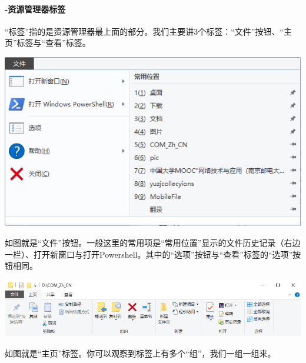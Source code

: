 \paragraph{-资源管理器标签}
“标签”指的是资源管理器最上面的部分。我们主要讲3个标签：“文件”按钮、“主页”标签与“查看”标签。
\begin{center}
	\includegraphics[scale=0.8]{pic/Exp4}
\end{center} \par
如图就是“文件”按钮。一般这里的常用项是“常用位置”显示的文件历史记录（右边一栏）、打开新窗口与打开Powershell。其中的“选项”按钮与“查看”标签的“选项”按钮相同。
\begin{center}
	\includegraphics[scale=0.8]{pic/Exp9}
\end{center} \par
如图就是“主页”标签。你可以观察到标签上有多个“组”，我们一组一组来。\par
